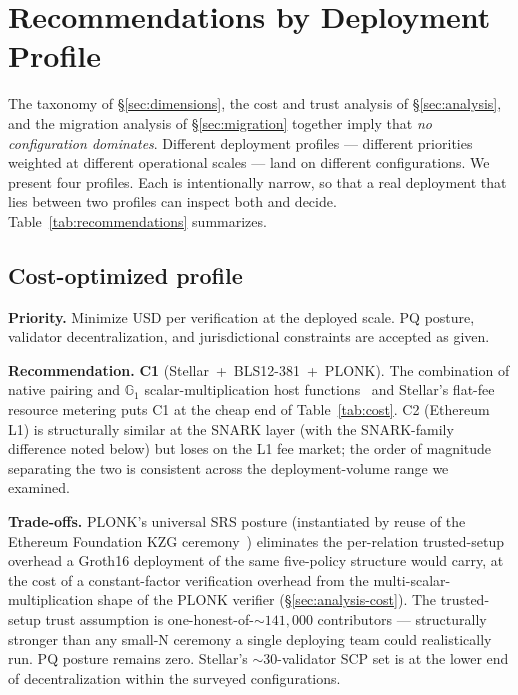 \section{Recommendations by Deployment Profile}
\label{sec:recommendations}

The taxonomy of \S\ref{sec:dimensions}, the cost and trust analysis
of \S\ref{sec:analysis}, and the migration analysis of
\S\ref{sec:migration} together imply that \emph{no configuration
dominates}. Different deployment profiles --- different priorities
weighted at different operational scales --- land on different
configurations. We present four profiles. Each is intentionally
narrow, so that a real deployment that lies between two profiles can
inspect both and decide. Table~\ref{tab:recommendations} summarizes.

\subsection{Cost-optimized profile}
\label{sec:rec-cost}

\textbf{Priority.} Minimize USD per verification at the deployed scale.
PQ posture, validator decentralization, and jurisdictional
constraints are accepted as given.

\textbf{Recommendation.} \textbf{C1} (Stellar~+~BLS12-381~+~PLONK).
The combination of native pairing and $\mathbb{G}_1$
scalar-multiplication host
functions~\cite{stellar-cap-0059} and Stellar's flat-fee resource
metering puts C1 at the cheap end of Table~\ref{tab:cost}. C2
(Ethereum L1) is structurally similar at the SNARK layer (with the
SNARK-family difference noted below) but loses on the L1 fee
market; the order of magnitude separating the two is consistent
across the deployment-volume range we examined.

\textbf{Trade-offs.} PLONK's universal SRS posture (instantiated by
reuse of the Ethereum Foundation KZG
ceremony~\cite{eth-kzg-ceremony}) eliminates the per-relation
trusted-setup overhead a Groth16 deployment of the same five-policy
structure would carry, at the cost of a constant-factor
verification overhead from the multi-scalar-multiplication shape of
the PLONK verifier (\S\ref{sec:analysis-cost}). The trusted-setup
trust assumption is one-honest-of-${\sim}141{,}000$ contributors
--- structurally stronger than any small-N ceremony a single
deploying team could realistically run. PQ posture remains zero.
Stellar's $\sim$30-validator SCP set is at the lower end of
decentralization within the surveyed configurations.

